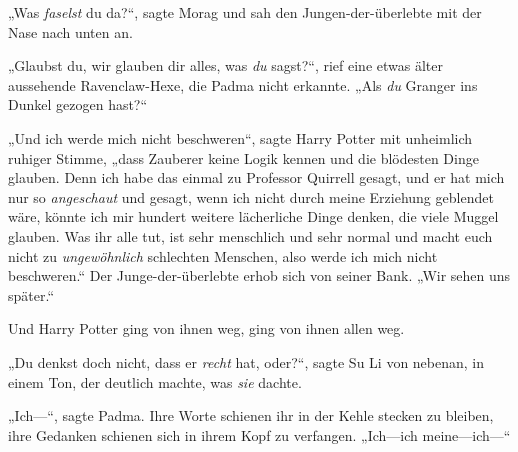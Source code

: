 „Was \emph{faselst} du da?“, sagte Morag und sah den Jungen-der-überlebte mit der Nase nach unten an.

„Glaubst du, wir glauben dir alles, was \emph{du} sagst?“, rief eine etwas älter aussehende Ravenclaw-Hexe, die Padma nicht erkannte. „Als \emph{du} Granger ins Dunkel gezogen hast?“

„Und ich werde mich nicht beschweren“, sagte Harry Potter mit unheimlich ruhiger Stimme, „dass Zauberer keine Logik kennen und die blödesten Dinge glauben. Denn ich habe das einmal zu Professor Quirrell gesagt, und er hat mich nur so \emph{angeschaut} und gesagt, wenn ich nicht durch meine Erziehung geblendet wäre, könnte ich mir hundert weitere lächerliche Dinge denken, die viele Muggel glauben. Was ihr alle tut, ist sehr menschlich und sehr normal und macht euch nicht zu \emph{ungewöhnlich} schlechten Menschen, also werde ich mich nicht beschweren.“
Der Junge-der-überlebte erhob sich von seiner Bank.
„Wir sehen uns später.“

Und Harry Potter ging von ihnen weg, ging von ihnen allen weg.

„Du denkst doch nicht, dass er \emph{recht} hat, oder?“, sagte Su Li von nebenan, in einem Ton, der deutlich machte, was \emph{sie} dachte.

„Ich—“, sagte Padma. Ihre Worte schienen ihr in der Kehle stecken zu bleiben, ihre Gedanken schienen sich in ihrem Kopf zu verfangen. „Ich—ich meine—ich—“

